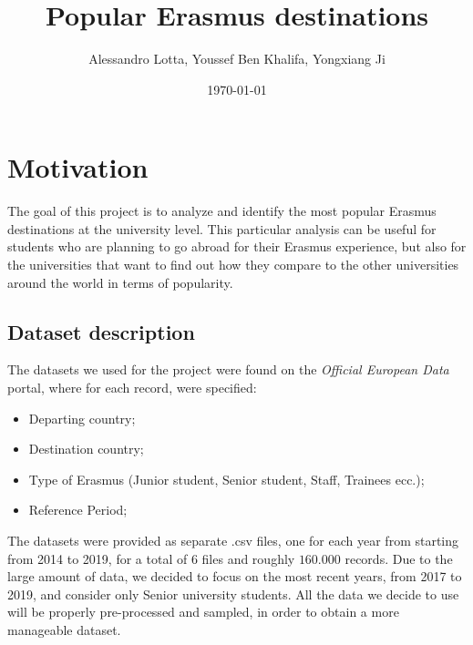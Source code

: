 
\usepackage{hyperref}
\usepackage{xurl}
\title{Popular Erasmus destinations}
\author{Alessandro Lotta, Youssef Ben Khalifa, Yongxiang Ji}
\date{\today}

\maketitle \tableofcontents 
\listofalgorithms
\newpage
\section{Motivation}
    The goal of this project is to analyze and identify the most popular Erasmus destinations at the university level. This particular analysis
    can be useful for students who are planning to go abroad for their Erasmus experience, but also for the universities that want to find out 
    how they compare to the other universities around the world in terms of popularity. 
\subsection{Dataset description}
    The datasets we used for the project were found on the \textit{Official European Data} portal, where for each record, were specified:
    \begin{itemize}
        \item Departing country;
        \item Destination country;
        \item Type of Erasmus (Junior student, Senior student, Staff, Trainees ecc.);
        \item Reference Period;
    \end{itemize}
    The datasets were provided as separate .csv files, one for each year from starting from 2014 to 2019, for a total of 6 files and roughly $160.000$ records.
    Due to the large amount of data, we decided to focus on the most recent years, from 2017 to 2019, and consider only Senior university students. All the data we decide 
    to use will be properly pre-processed and sampled, in order to obtain a more manageable dataset. 
